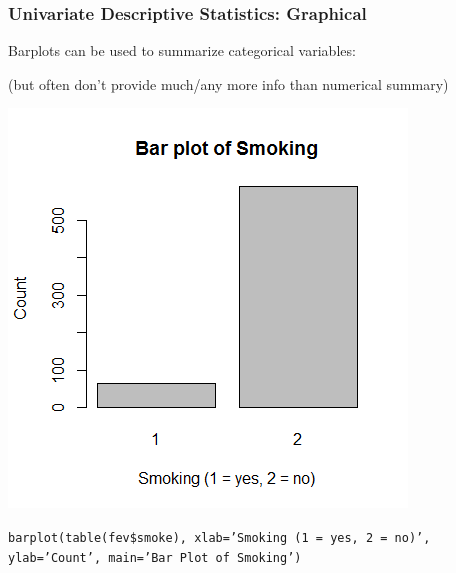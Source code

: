 \documentclass[12pt, 
hyperref={colorlinks=true, linkcolor=blue, urlcolor=cyan}]{beamer}
\begin{document}
\begin{frame}
\frametitle{Univariate Descriptive Statistics: Graphical}

Barplots can be used to summarize categorical variables: \\ \begin{footnotesize} (but often don't provide much/any more info than numerical summary) \end{footnotesize}\vspace{-0.8cm}

\center \includegraphics[height=0.7\textheight]{./barplot-smoke}

\vspace{-0.8cm} \begin{scriptsize} \texttt{barplot(table(fev\$smoke), xlab='Smoking (1 = yes, 2 = no)', ylab='Count', main='Bar Plot of Smoking')} \end{scriptsize}
\end{frame}
\end{document}
